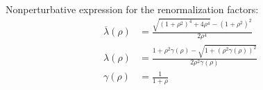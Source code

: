 \documentclass[xcolor=x11names,compress,professionalfonts]{beamer}
\renewcommand{\(}{\begin{columns}}
\renewcommand{\)}{\end{columns}}
\newcommand{\<}[1]{\begin{column}{#1}}
\renewcommand{\>}{\end{column}}
\newcommand{\lb}{\ensuremath{\overline{\lambda}}}
\begin{document}
\begin{frame}
Nonperturbative expression for the renormalization factors:
\begin{align*}
\label{eq:lb}
	\lb(\rho) &= \frac{\sqrt{(1+\rho^2)^4+4\rho^4}-(1+\rho^2)^2}{2\rho^4}\\
	\lambda(\rho) &= \frac{1+\rho^2 \gamma(\rho) - \sqrt{1+(\rho^2 \gamma(\rho))^2}}{2 \rho^2\gamma(\rho)} \\
	\gamma(\rho) &= \frac{1}{1+\rho}
\end{align*}
\end{frame}
\end{document}

